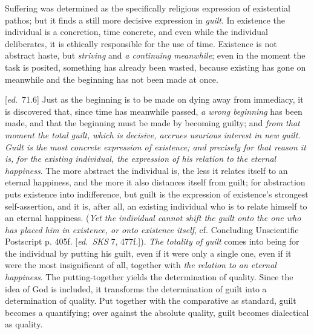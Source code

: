 \documentclass[12pt,a4paper,openany]{book}
\newcommand{\ed}[1]{{\small[\textit{ed.}\ #1]}}
\begin{document}
Suffering was determined as the specifically religious expression of existential pathos;
but it finds a still more decisive expression
in \emph{guilt}. In existence the individual is a concretion, time concrete,
and even while the individual deliberates, it is ethically responsible for the use
of time. Existence is not abstract haste, but \emph{striving} and \emph{a
continuing meanwhile}; even in the moment the task is posited, something
has already been wasted, because existing has gone on meanwhile and the beginning has not
been made at once.

\ed{71.6} Just as the beginning is to be made on dying away from immediacy,
it is discovered that, since time has meanwhile passed,
\emph{a wrong beginning} has been made, and that the beginning must be made by becoming
guilty; and \emph{from that moment the total guilt, which is decisive, accrues usurious interest in new
guilt. Guilt is the most concrete expression of existence; and precisely for that reason it is, for the existing individual,
the expression of his relation to the eternal happiness}. The more abstract the individual
is, the less it relates itself to an eternal happiness, and the
more it also distances itself from guilt; for abstraction puts existence
into indifference, but guilt is the expression of existence's strongest
self-assertion, and it is, after all, an existing individual who is to relate himself to an
eternal happiness. (\emph{Yet the individual cannot shift the guilt onto the one who has placed
him in existence, or onto existence itself}, cf. Concluding Unscientific
Postscript p. 405f. \ed{\emph{SKS} 7, 477f.}). \emph{The totality of guilt} comes into being
for the individual by putting his guilt, even if it were only a single one,
even if it were the most insignificant of all, together with \emph{the relation to an
eternal happiness}. The putting-together yields the determination of quality. Since
the idea of God is included, it transforms the determination of guilt into a
determination of quality. Put together with the comparative as
standard, guilt becomes a quantifying; over against the absolute
quality, guilt becomes dialectical as quality.
\end{document}
